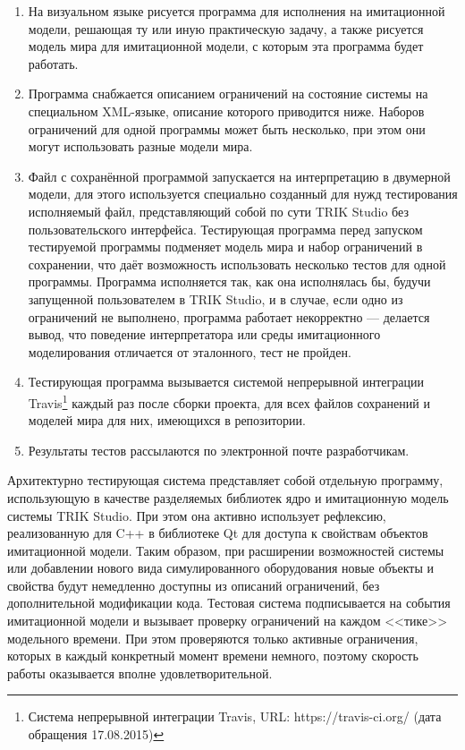\documentclass[conference]{IEEEtran}
\begin{document}
\begin{enumerate}
	\item На визуальном языке рисуется программа для исполнения на имитационной модели, решающая ту или 
			иную практическую задачу, а также рисуется модель мира для имитационной модели, с которым эта программа будет работать.
	\item Программа снабжается описанием ограничений на состояние системы на специальном XML-языке, описание 
			которого приводится ниже. Наборов ограничений для одной программы может быть несколько, при этом 
			они могут использовать разные модели мира.
	\item Файл с сохранённой программой запускается на интерпретацию в двумерной модели, для этого используется 
			специально созданный для нужд тестирования исполняемый файл, представляющий собой по сути TRIK Studio 
			без пользовательского интерфейса. Тестирующая программа перед запуском тестируемой программы подменяет 
			модель мира и набор ограничений в сохранении, что даёт возможность использовать несколько тестов 
			для одной программы. Программа исполняется так, как она исполнялась бы, будучи запущенной пользователем 
			в TRIK Studio, и в случае, если одно из ограничений не выполнено, программа работает некорректно --- делается 
			вывод, что поведение интерпретатора или среды имитационного моделирования отличается от эталонного, 
			тест не пройден.
	\item Тестирующая программа вызывается системой непрерывной интеграции Travis\footnote{Система непрерывной интеграции Travis, URL: https://travis-ci.org/ (дата обращения 17.08.2015)} 
			каждый раз после сборки проекта, для всех файлов сохранений и моделей мира для них, имеющихся в репозитории.
	\item Результаты тестов рассылаются по электронной почте разработчикам.
\end{enumerate}

Архитектурно тестирующая система представляет собой отдельную программу, использующую в качестве
разделяемых библиотек ядро и имитационную модель системы TRIK Studio. При этом она
активно использует рефлексию, реализованную для C++ в библиотеке Qt для доступа к свойствам
объектов имитационной модели. Таким образом, при расширении возможностей системы или добавлении
нового вида симулированного оборудования новые объекты и свойства будут немедленно доступны из 
описаний ограничений, без дополнительной модификации кода. Тестовая система подписывается 
на события имитационной модели и вызывает проверку ограничений на каждом <<тике>> 
модельного времени. При этом проверяются только активные ограничения, которых в каждый 
конкретный момент времени немного, поэтому скорость работы оказывается вполне удовлетворительной.
\end{document}
